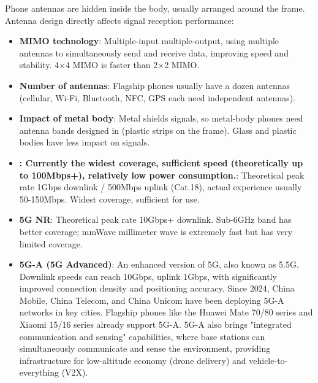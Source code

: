 
Phone antennas are hidden inside the body, usually arranged around the frame. Antenna design directly affects signal reception performance:

\begin{itemize}
  \item \textbf{MIMO technology}: Multiple-input multiple-output, using multiple antennas to simultaneously send and receive data, improving speed and stability. 4×4 MIMO is faster than 2×2 MIMO.
  \item \textbf{Number of antennas}: Flagship phones usually have a dozen antennas (cellular, Wi-Fi, Bluetooth, NFC, GPS each need independent antennas).
  \item \textbf{Impact of metal body}: Metal shields signals, so metal-body phones need antenna bands designed in (plastic strips on the frame). Glass and plastic bodies have less impact on signals.
\end{itemize}


\begin{itemize}
  \item \textbf{: Currently the widest coverage, sufficient speed (theoretically up to 100Mbps+), relatively low power consumption.}: Theoretical peak rate 1Gbps downlink / 500Mbps uplink (Cat.18), actual experience usually 50-150Mbps. Widest coverage, sufficient for use.
  \item \textbf{5G NR}: Theoretical peak rate 10Gbps+ downlink. Sub-6GHz band has better coverage; mmWave millimeter wave is extremely fast but has very limited coverage.
  \item \textbf{5G-A (5G Advanced)}: An enhanced version of 5G, also known as 5.5G. Downlink speeds can reach 10Gbps, uplink 1Gbps, with significantly improved connection density and positioning accuracy. Since 2024, China Mobile, China Telecom, and China Unicom have been deploying 5G-A networks in key cities. Flagship phones like the Huawei Mate 70/80 series and Xiaomi 15/16 series already support 5G-A. 5G-A also brings "integrated communication and sensing" capabilities, where base stations can simultaneously communicate and sense the environment, providing infrastructure for low-altitude economy (drone delivery) and vehicle-to-everything (V2X).
\end{itemize}


